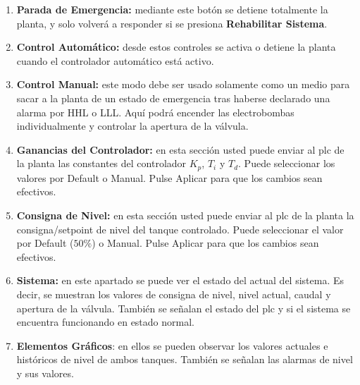 \begin{enumerate}
\item \textbf{Parada de Emergencia:} mediante este botón se detiene totalmente
la planta, y solo volverá a responder si se presiona \textbf{Rehabilitar
Sistema}.
 \item \textbf{Control Automático:} desde estos controles se activa o detiene
la planta cuando el controlador automático está activo.
 \item \textbf{Control Manual:} este modo debe ser usado solamente como un
medio para
sacar a la planta de un estado de emergencia tras  haberse declarado una alarma
por HHL o LLL.
Aquí podrá encender las electrobombas individualmente y controlar la apertura
de la válvula.
 \item \textbf{Ganancias del Controlador:} en esta sección usted puede enviar al
\gls{plc} de la planta las constantes del controlador $K_p$, $T_i$ y $T_d$. 
Puede seleccionar los valores por Default o Manual. Pulse Aplicar para que los
cambios sean efectivos.
 \item \textbf{Consigna de Nivel:} en esta sección usted puede enviar al
\gls{plc} de la planta la consigna/setpoint de nivel del tanque controlado. 
Puede seleccionar el valor por Default ($50\%$) o Manual. Pulse Aplicar para
que
los cambios sean efectivos.
 \item \textbf{Sistema:} en este apartado se puede ver el estado del actual del
sistema. Es decir, se muestran los valores de consigna de nivel, nivel
actual, caudal y apertura de la válvula. También se señalan el estado del 
\gls{plc} y si el sistema se encuentra funcionando en estado normal.
\item \textbf{Elementos Gráficos}: en ellos se pueden observar los valores
actuales e
históricos de nivel de ambos tanques. También se señalan las alarmas de nivel y
sus valores.
\end{enumerate}
